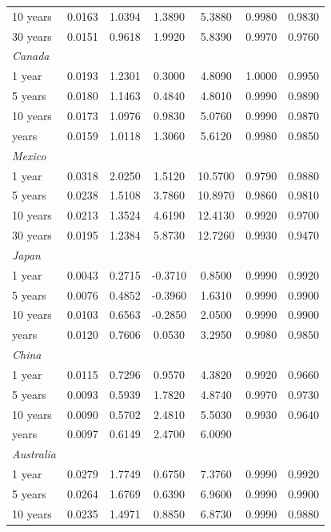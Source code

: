 \documentclass{article}
\begin{document}
\begin{table}[H]
\begin{tabular}{l c c c c c c}
10 years	&	0.0163	&	1.0394	&	1.3890	&	5.3880	&	0.9980	&	0.9830	\\
30 years	&	0.0151	&	0.9618	&	1.9920	&	5.8390	&	0.9970	&	0.9760	\\
\textit{Canada}	&		&		&		&		&		&		\\
1 year	&	0.0193	&	1.2301	&	0.3000	&	4.8090	&	1.0000	&	0.9950	\\
5 years	&	0.0180	&	1.1463	&	0.4840	&	4.8010	&	0.9990	&	0.9890	\\
10 years	&	0.0173	&	1.0976	&	0.9830	&	5.0760	&	0.9990	&	0.9870	\\
\medskip													
30 years	&	0.0159	&	1.0118	&	1.3060	&	5.6120	&	0.9980	&	0.9850	\\
\textit{Mexico}	&		&		&		&		&		&		\\
1 year	&	0.0318	&	2.0250	&	1.5120	&	10.5700	&	0.9790	&	0.9880	\\
5 years	&	0.0238	&	1.5108	&	3.7860	&	10.8970	&	0.9860	&	0.9810	\\
10 years	&	0.0213	&	1.3524	&	4.6190	&	12.4130	&	0.9920	&	0.9700	\\
30 years	&	0.0195	&	1.2384	&	5.8730	&	12.7260	&	0.9930	&	0.9470	\\
\textit{Japan}	&		&		&		&		&		&		\\
1 year	&	0.0043	&	0.2715	&	-0.3710	&	0.8500	&	0.9990	&	0.9920	\\
5 years	&	0.0076	&	0.4852	&	-0.3960	&	1.6310	&	0.9990	&	0.9900	\\
10 years	&	0.0103	&	0.6563	&	-0.2850	&	2.0500	&	0.9990	&	0.9900	\\
\medskip													
30 years	&	0.0120	&	0.7606	&	0.0530	&	3.2950	&	0.9980	&	0.9850	\\
\textit{China}	&		&		&		&		&		&		\\
1 year	&	0.0115	&	0.7296	&	0.9570	&	4.3820	&	0.9920	&	0.9660	\\
5 years	&	0.0093	&	0.5939	&	1.7820	&	4.8740	&	0.9970	&	0.9730	\\
10 years	&	0.0090	&	0.5702	&	2.4810	&	5.5030	&	0.9930	&	0.9640	\\
\medskip													
30 years	&	0.0097	&	0.6149	&	2.4700	&	6.0090	&		&		\\
\textit{Australia}	&		&		&		&		&		&		\\
1 year	&	0.0279	&	1.7749	&	0.6750	&	7.3760	&	0.9990	&	0.9920	\\
5 years	&	0.0264	&	1.6769	&	0.6390	&	6.9600	&	0.9990	&	0.9900	\\
10 years	&	0.0235	&	1.4971	&	0.8850	&	6.8730	&	0.9990	&	0.9880	\\

\end{tabular}
\end{table}
\end{document}
